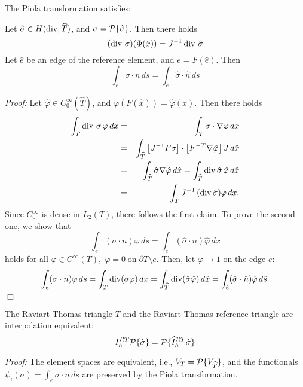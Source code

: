 The Piola transformation satisfies:
\begin{lemma} Let $\hat \sigma \in H(\operatorname{div}, \widehat T)$, and 
$\sigma = {\cal P} \{ \hat \sigma \}$. Then there holds
$$
(\operatorname{div} \, \sigma) (\Phi (\hat x)) = J^{-1} \operatorname{div} \, \hat \sigma
$$
Let $\hat e$ be an edge of the reference element, and $e = F (\hat e)$.
Then
$$
\int_e \sigma \cdot n \, ds = \int_{\hat e} \hat \sigma \cdot \hat n \, ds
$$
\end{lemma}
{\em Proof:} Let $\widehat \varphi \in C_0^\infty (\widehat T)$, 
and $\varphi(F(\hat x)) = \widehat \varphi (x)$. Then there holds
\begin{eqnarray*}
\int_T \operatorname{div} \, \sigma \, \varphi \, dx & = & \int_T \sigma \cdot \nabla \varphi \, dx  \\
& = & \int_{\widehat T} \left[ J^{-1} F \sigma \right] \cdot \left[ F^{-T} \nabla \hat \varphi \right] J \, d \hat x \\
& = & \int_{\widehat T} \hat \sigma \nabla \hat \varphi \, d \hat x 
= \int_{\widehat T} \operatorname{div} \hat \sigma \, \hat \varphi \, d \hat x \\
& = & \int_T J^{-1} \, (\operatorname{div} \hat \sigma) \varphi \, dx.
\end{eqnarray*}
Since $C_0^\infty$ is dense in $L_2(T)$, there follows the first claim.
To prove the second one, we show that
$$
\int_e (\sigma \cdot n) \varphi \, ds = \int_{\hat e} (\hat \sigma \cdot n) \hat \varphi \, dx
$$
holds for all $\varphi \in C^\infty (T), \; \varphi = 0 \; \mbox{on} \; \partial T \setminus e$. Then, let $\varphi \rightarrow 1$ on the edge $e$:
\begin{eqnarray*}
\int_e (\sigma \cdot n) \varphi \, ds = \int_T \operatorname{div} (\sigma \varphi) \, dx
= \int_{\widehat T} \operatorname{div} (\hat \sigma \hat \varphi) \, d \hat x =
\int_{\hat e} (\hat \sigma \cdot \hat n) \hat \varphi \, d \hat s.
\end{eqnarray*}
\hfill $\Box$

\begin{lemma} The Raviart-Thomas triangle $T$ and the Raviart-Thomas
reference triangle are interpolation equivalent:
$$
I_h^{RT} { \cal P } \{ \hat \sigma \} = 
 {\cal P} \{ \widehat I_h^{RT} \hat \sigma \}
$$
\end{lemma}
{\em Proof:} The element spaces are equivalent, i.e., 
$V_T = {\cal P} \{ V_{\widehat T} \}$, and the functionals $\psi_i (\sigma) = \int_e \sigma \cdot n \, ds$ are preserved by the Piola transformation.


\bigskip

